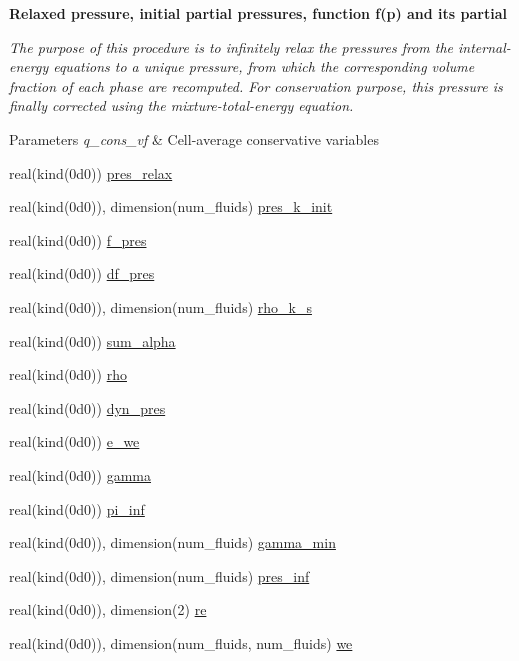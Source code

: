 \begin{Indent}\textbf{ Relaxed pressure, initial partial pressures, function f(p) and its partial}\par
{\em The purpose of this procedure is to infinitely relax the pressures from the internal-\/energy equations to a unique pressure, from which the corresponding volume fraction of each phase are recomputed. For conservation purpose, this pressure is finally corrected using the mixture-\/total-\/energy equation.


\begin{DoxyParams}{Parameters}
{\em q\+\_\+cons\+\_\+vf} & Cell-\/average conservative variables \\
\hline
\end{DoxyParams}
}\begin{DoxyCompactItemize}
\item 
real(kind(0d0)) \hyperlink{m__rhs_8f90_a9dff053a7e3f9c1702a161f55d3e1726}{pres\+\_\+relax}
\item 
real(kind(0d0)), dimension(num\+\_\+fluids) \hyperlink{m__rhs_8f90_a762d1c12479dcf998f8a5a47dc258ddc}{pres\+\_\+k\+\_\+init}
\item 
real(kind(0d0)) \hyperlink{m__rhs_8f90_a250b49b4cd6e8ad9bcd9e2a7b46c39dc}{f\+\_\+pres}
\item 
real(kind(0d0)) \hyperlink{m__rhs_8f90_afab53b80fef38424acbbd772be46d333}{df\+\_\+pres}
\item 
real(kind(0d0)), dimension(num\+\_\+fluids) \hyperlink{m__rhs_8f90_aa5195db0f89eb91b6f5544e9764412a0}{rho\+\_\+k\+\_\+s}
\item 
real(kind(0d0)) \hyperlink{m__rhs_8f90_a796247036b68f5c2f04db3b4c943b5f2}{sum\+\_\+alpha}
\item 
real(kind(0d0)) \hyperlink{m__rhs_8f90_a340bafa0c8d745c3060facd9cfef7ec4}{rho}
\item 
real(kind(0d0)) \hyperlink{m__rhs_8f90_a2d84a02a65f699f43818db9feca4e25d}{dyn\+\_\+pres}
\item 
real(kind(0d0)) \hyperlink{m__rhs_8f90_a4cb69ecc8e60cb3bfbe57aab771d6c48}{e\+\_\+we}
\item 
real(kind(0d0)) \hyperlink{m__rhs_8f90_a298183e270a405e0f180d45940bb6f8a}{gamma}
\item 
real(kind(0d0)) \hyperlink{m__rhs_8f90_aeed4eb93ccb2725da7a4756e510dda03}{pi\+\_\+inf}
\item 
real(kind(0d0)), dimension(num\+\_\+fluids) \hyperlink{m__rhs_8f90_aba715ebddc63d396377dc69d35cb50f8}{gamma\+\_\+min}
\item 
real(kind(0d0)), dimension(num\+\_\+fluids) \hyperlink{m__rhs_8f90_a5e9ec5159360030b214597511982bb81}{pres\+\_\+inf}
\item 
real(kind(0d0)), dimension(2) \hyperlink{m__rhs_8f90_a6c337b82dc4c47f2d3cc57408aa1fc9f}{re}
\item 
real(kind(0d0)), dimension(num\+\_\+fluids, num\+\_\+fluids) \hyperlink{m__rhs_8f90_a19a438a95f2945b7c9e492f2ee983263}{we}
\end{DoxyCompactItemize}
\end{Indent}
